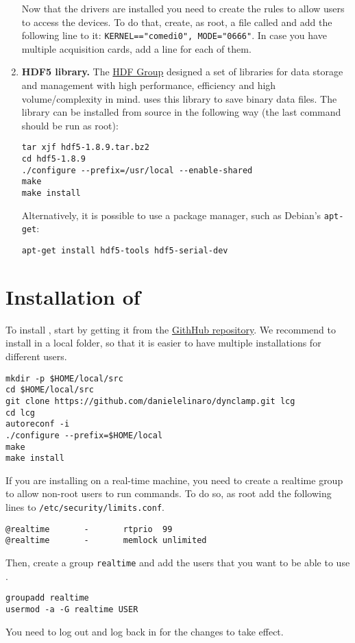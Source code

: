 \begin{enumerate}
Now that the drivers are installed you need to create the rules to
allow users to access the devices. To do that, create, as root, a file
called  and add the
following line to it: \texttt{KERNEL=="comedi0", MODE="0666"}. In case
you have multiple acquisition cards, add a line for each of them.
\item \textbf{HDF5 library.}
The \href{http://www.hdfgroup.org/HDF5/}{HDF Group} designed a set of
libraries for data storage and management with high performance,
efficiency and high volume/complexity in mind. \textbf{\progname} uses
this library to save binary data files. The
library can be installed from source in the following way (the last
command should be run as root):
\begin{lstlisting}
tar xjf hdf5-1.8.9.tar.bz2
cd hdf5-1.8.9
./configure --prefix=/usr/local --enable-shared
make
make install
\end{lstlisting}
Alternatively, it is possible to use a package manager, such as
Debian's \verb+apt-get+: 
\begin{lstlisting}
apt-get install hdf5-tools hdf5-serial-dev
\end{lstlisting}
\end{enumerate}

\section{Installation of \progname}
\label{install:program}
To install \progname, start by getting it from the
\href{https://github.com/danielelinaro/dynclamp}{GithHub
  repository}. We recommend to install \progname in a local folder, so
that it is easier to have multiple installations for different users.
\begin{lstlisting}
mkdir -p $HOME/local/src
cd $HOME/local/src
git clone https://github.com/danielelinaro/dynclamp.git lcg
cd lcg
autoreconf -i
./configure --prefix=$HOME/local
make
make install
\end{lstlisting}

If you are installing \progname on a real-time machine,
you need to create a realtime group to allow non-root
users to run \progname commands. To do so, as root add
the following lines to \texttt{/etc/security/limits.conf}.
\begin{lstlisting}
@realtime       -       rtprio  99
@realtime       -       memlock unlimited
\end{lstlisting}
Then, create a group \texttt{realtime} and add the users that you want
to be able to use \progname.
\begin{lstlisting}
groupadd realtime
usermod -a -G realtime USER
\end{lstlisting}
You need to log out and log back in for the changes to take effect.

